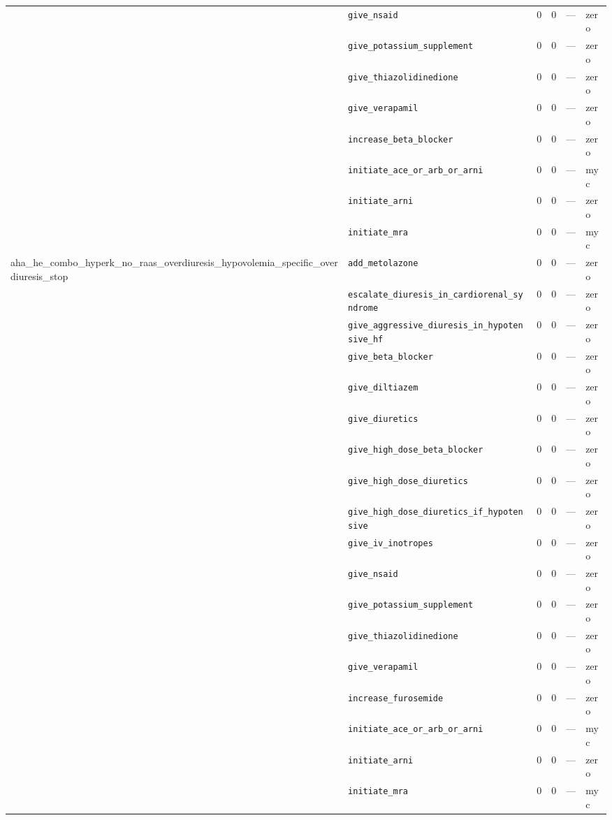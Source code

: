 \begin{table}[ht]
\begin{tabular}{llrrrl}
 & \texttt{give\_nsaid} & 0 & 0 & — & zero \\
 & \texttt{give\_potassium\_supplement} & 0 & 0 & — & zero \\
 & \texttt{give\_thiazolidinedione} & 0 & 0 & — & zero \\
 & \texttt{give\_verapamil} & 0 & 0 & — & zero \\
 & \texttt{increase\_beta\_blocker} & 0 & 0 & — & zero \\
 & \texttt{initiate\_ace\_or\_arb\_or\_arni} & 0 & 0 & — & myc \\
 & \texttt{initiate\_arni} & 0 & 0 & — & zero \\
 & \texttt{initiate\_mra} & 0 & 0 & — & myc \\
\midrule
aha\_he\_combo\_hyperk\_no\_raas\_overdiuresis\_hypovolemia\_specific\_overdiuresis\_stop & \texttt{add\_metolazone} & 0 & 0 & — & zero \\
 & \texttt{escalate\_diuresis\_in\_cardiorenal\_syndrome} & 0 & 0 & — & zero \\
 & \texttt{give\_aggressive\_diuresis\_in\_hypotensive\_hf} & 0 & 0 & — & zero \\
 & \texttt{give\_beta\_blocker} & 0 & 0 & — & zero \\
 & \texttt{give\_diltiazem} & 0 & 0 & — & zero \\
 & \texttt{give\_diuretics} & 0 & 0 & — & zero \\
 & \texttt{give\_high\_dose\_beta\_blocker} & 0 & 0 & — & zero \\
 & \texttt{give\_high\_dose\_diuretics} & 0 & 0 & — & zero \\
 & \texttt{give\_high\_dose\_diuretics\_if\_hypotensive} & 0 & 0 & — & zero \\
 & \texttt{give\_iv\_inotropes} & 0 & 0 & — & zero \\
 & \texttt{give\_nsaid} & 0 & 0 & — & zero \\
 & \texttt{give\_potassium\_supplement} & 0 & 0 & — & zero \\
 & \texttt{give\_thiazolidinedione} & 0 & 0 & — & zero \\
 & \texttt{give\_verapamil} & 0 & 0 & — & zero \\
 & \texttt{increase\_furosemide} & 0 & 0 & — & zero \\
 & \texttt{initiate\_ace\_or\_arb\_or\_arni} & 0 & 0 & — & myc \\
 & \texttt{initiate\_arni} & 0 & 0 & — & zero \\
 & \texttt{initiate\_mra} & 0 & 0 & — & myc \\

\end{tabular}
\end{table}
